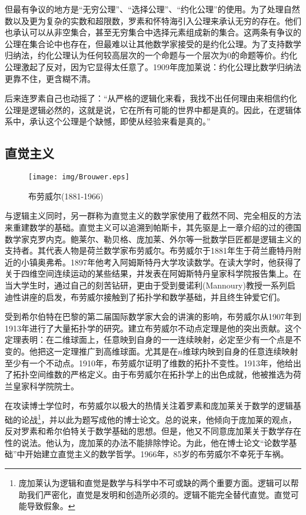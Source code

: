 \documentclass{article}
\begin{document}
但最有争议的地方是“无穷公理”、“选择公理”、“约化公理”的使用。为了处理自然数以及更为复杂的实数和超限数，罗素和怀特海引入公理来承认无穷的存在。他们也承认可以从非空集合，甚至无穷集合中选择元素组成新的集合。这两条有争议的公理在集合论中也存在，但最难以让其他数学家接受的是约化公理。为了支持数学归纳法，约化公理认为任何较高层次的一个命题与一个层次为0的命题等价。约化公理激起了反对，因为它显得太任意了。1909年庞加莱说：约化公理比数学归纳法更靠不住，更含糊不清。

后来连罗素自己也动摇了：“从严格的逻辑化来看，我找不出任何理由来相信约化公理是逻辑必然的，这就是说，它在所有可能的世界中都是真的。因此，在逻辑体系中，承认这个公理是个缺憾，即使从经验来看是真的。”\cite{M-Kline-2007}

\subsection{直觉主义}

\begin{wrapfigure}{L}{0.4\textwidth}
 \centering
 \texttt{[image: img/Brouwer.eps]}
 \captionsetup{labelformat=empty}
 \caption{布劳威尔(1881-1966)}
 \label{fig:Brouwer}
\end{wrapfigure}

与逻辑主义同时，另一群称为直觉主义的数学家使用了截然不同、完全相反的方法来重建数学的基础。直觉主义可以追溯到帕斯卡，其先驱是上一章介绍的过的德国数学家克罗内克。鲍莱尔、勒贝格、庞加莱、外尔等一批数学巨匠都是逻辑主义的支持者。其代表人物是荷兰数学家布劳威尔。布劳威尔于1881年生于荷兰鹿特丹附近的小镇奥弗希。1897年他考入阿姆斯特丹大学攻读数学。在读大学时，他获得了关于四维空间连续运动的某些结果，并发表在阿姆斯特丹皇家科学院报告集上。在当大学生时，通过自己的刻苦钻研，更由于受到曼诺利(Mannoury)教授一系列启迪性讲座的启发，布劳威尔接触到了拓扑学和数学基础，并且终生钟爱它们。

受到希尔伯特在巴黎的第二届国际数学家大会的讲演的影响，布劳威尔从1907年到1913年进行了大量拓扑学的研究。建立布劳威尔不动点定理是他的突出贡献。这个定理表明：在二维球面上，任意映到自身的一一连续映射，必定至少有一个点是不变的。他把这一定理推广到高维球面。尤其是在$n$维球内映到自身的任意连续映射至少有一个不动点。1910年，布劳威尔证明了维数的拓扑不变性。1913年，他给出了拓扑空间维数的严格定义。由于布劳威尔在拓扑学上的出色成就，他被推选为荷兰皇家科学院院士。

在攻读博士学位时，布劳威尔以极大的热情关注着罗素和庞加莱关于数学的逻辑基础的论战\footnote{庞加莱认为逻辑和直觉是数学与科学中不可或缺的两个重要方面。逻辑可以帮助我们严密化，直觉是发明和创造所必须的。逻辑不能完全替代直觉。直觉可能导致假象\cite{Poincare2}。}，并以此为题写成他的博士论文。总的说来，他倾向于庞加莱的观点，反对罗素和希尔伯特关于数学基础的思想。但是，他又不同意庞加莱关于数学存在性的说法。他认为，庞加莱的办法不能排除悖论。为此，他在博士论文“论数学基础”中开始建立直觉主义的数学哲学。1966年，85岁的布劳威尔不幸死于车祸。
\end{document}
